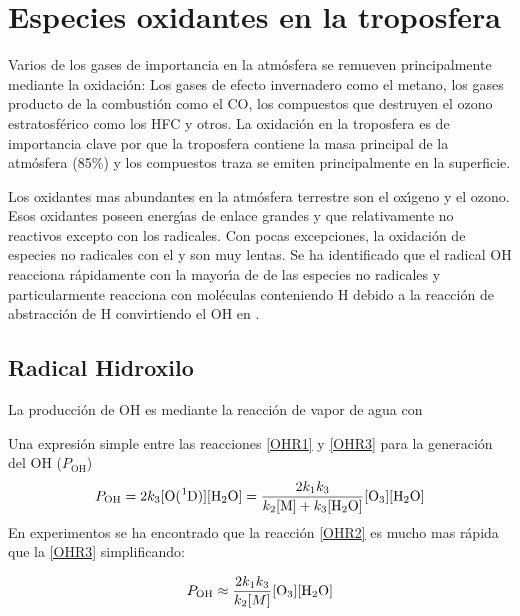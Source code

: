 \section{Especies oxidantes en la troposfera}
Varios de los gases de importancia en la atm\'osfera se remueven principalmente mediante la oxidaci\'on: Los gases de efecto invernadero como el metano, los gases producto de la combusti\'on como el CO, los compuestos que destruyen el ozono estratosf\'erico como los HFC y otros. La oxidaci\'on en la troposfera es de importancia clave por que la troposfera contiene la masa principal de la atm\'osfera (85\%) y los compuestos traza se emiten principalmente en la superficie.

Los oxidantes mas abundantes en la atm\'osfera terrestre son el ox\'{\i}geno y el ozono. Esos oxidantes poseen energ\'{\i}as de enlace grandes y que relativamente no reactivos excepto con los radicales. Con pocas excepciones, la oxidaci\'on de especies no radicales con el  y  son muy lentas. Se ha identificado que el radical OH reacciona r\'apidamente con la mayor\'{\i}a de de las especies no radicales y particularmente reacciona con mol\'eculas conteniendo H debido a la reacci\'on de abstracci\'on de H convirtiendo el OH en . 

\subsection{Radical Hidroxilo}

La producci\'on de OH es mediante la reacci\'on de vapor de agua con 


Una expresi\'on simple entre las reacciones \ref{OHR1} y \ref{OHR3}  para la generaci\'on del OH  ($P_\mathrm{OH}$) 
\begin{equation}
P_\mathrm{OH}= 2k_3 [\ce{O(^1D)}] [\ce{H2O}] = \frac{2k_1k_3}{k_2[\mathrm{M]}+k_3[\ce{H2O}]} [\ce{O3}][\ce{H2O}] 
\end{equation}
En experimentos se ha encontrado que la reacci\'on \ref{OHR2} es mucho mas r\'apida que la \ref{OHR3} simplificando:

\begin{equation}
P_\mathrm{OH} \approx  \frac{2k_1k_3}{ k_2[M] } [\ce{O3}]  [\ce{H2O}] 
\end{equation}

